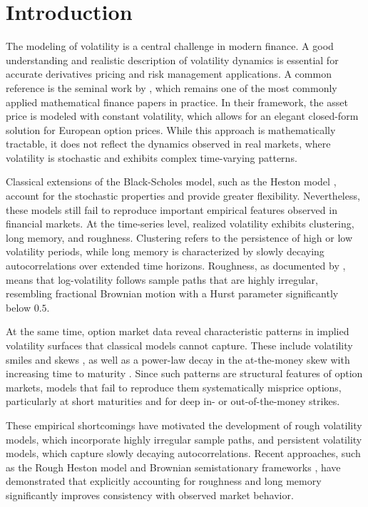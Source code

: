 \section{Introduction} \label{sec:Introduction}

The modeling of volatility is a central challenge in modern finance. A good understanding and realistic description of volatility dynamics is essential for accurate derivatives pricing and risk management applications. A common reference is the seminal work by \cite{BlackScholes1973}, which remains one of the most commonly applied mathematical finance papers in practice. In their framework, the asset price is modeled with constant volatility, which allows for an elegant closed-form solution for European option prices. While this approach is mathematically tractable, it does not reflect the dynamics observed in real markets, where volatility is stochastic and exhibits complex time-varying patterns.

Classical extensions of the Black-Scholes model, such as the Heston model \citep{Heston1993}, account for the stochastic properties and provide greater flexibility. Nevertheless, these models still fail to reproduce important empirical features observed in financial markets. At the time-series level, realized volatility exhibits clustering, long memory, and roughness. Clustering refers to the persistence of high or low volatility periods, while long memory is characterized by slowly decaying autocorrelations over extended time horizons. Roughness, as documented by \cite{GatheralJaissonRosenbaum2018}, means that log-volatility follows sample paths that are highly irregular, resembling fractional Brownian motion with a Hurst parameter significantly below $0.5$.

At the same time, option market data reveal characteristic patterns in implied volatility surfaces that classical models cannot capture. These include volatility smiles and skews \citep{Rubinstein1985}, as well as a power-law decay in the at-the-money skew with increasing time to maturity \citep{GatheralJaissonRosenbaum2018}. Since such patterns are structural features of option markets, models that fail to reproduce them systematically misprice options, particularly at short maturities and for deep in- or out-of-the-money strikes.

These empirical shortcomings have motivated the development of rough volatility models, which incorporate highly irregular sample paths, and persistent volatility models, which capture slowly decaying autocorrelations. Recent approaches, such as the Rough Heston model \citep{ElEuchRosenbaum2019} and Brownian semistationary frameworks \citep{BennedsenLundePakkanen2021}, have demonstrated that explicitly accounting for roughness and long memory significantly improves consistency with observed market behavior.

